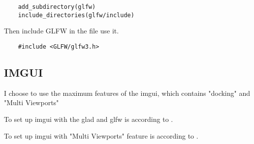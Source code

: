 \documentclass{article}
\theoremstyle{definition} %
\begin{document}
\begin{verbatim}
    add_subdirectory(glfw)
    include_directories(glfw/include)
\end{verbatim}

Then include GLFW in the file use it.

\begin{verbatim}
    #include <GLFW/glfw3.h>
\end{verbatim}

\subsection[IMGUI]{IMGUI}
I choose to use the maximum features of the
imgui, which contains "docking" and
"Multi Viewports"

To set up imgui with the glad and glfw is
according to
\cite[setupImgui]{example-if-you-are-using-glfw--openglwebgl}.

To set up imgui with "Multi Viewports" feature
is according to
\cite[text]{Multi-Viewports}.


\end{document}
